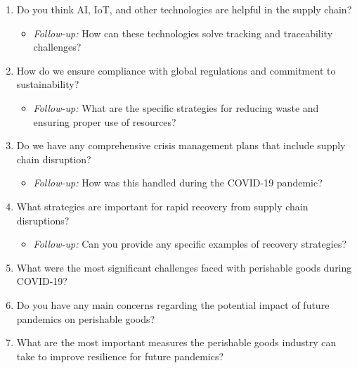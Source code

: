 \begin{enumerate}[leftmargin=*, label=\textbf{\arabic*.}]
    \item Do you think AI, IoT, and other technologies are helpful in the supply chain?
    \begin{itemize}[label=$\rightarrow$]
        \item \textit{Follow-up:} How can these technologies solve tracking and traceability challenges?
    \end{itemize}

    \item How do we ensure compliance with global regulations and commitment to sustainability?
    \begin{itemize}[label=$\rightarrow$]
        \item \textit{Follow-up:} What are the specific strategies for reducing waste and ensuring proper use of resources?
    \end{itemize}

    \item Do we have any comprehensive crisis management plans that include supply chain disruption?
    \begin{itemize}[label=$\rightarrow$]
        \item \textit{Follow-up:} How was this handled during the COVID-19 pandemic?
    \end{itemize}

    \item What strategies are important for rapid recovery from supply chain disruptions?
    \begin{itemize}[label=$\rightarrow$]
        \item \textit{Follow-up:} Can you provide any specific examples of recovery strategies?
    \end{itemize}

    \item What were the most significant challenges faced with perishable goods during COVID-19?

    \item Do you have any main concerns regarding the potential impact of future pandemics on perishable goods?

    \item What are the most important measures the perishable goods industry can take to improve resilience for future pandemics?

\end{enumerate}
